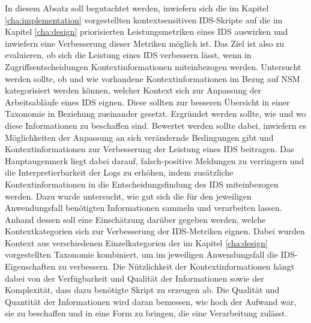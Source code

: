 In diesem Absatz soll begutachtet werden, inwiefern sich die im Kapitel \ref{cha:implementation} vorgestellten kontextsensitiven IDS-Skripte auf die im Kapitel \ref{cha:design} priorisierten Leistungsmetriken eines IDS auswirken und inwiefern eine Verbesserung dieser Metriken möglich ist. Das Ziel ist also zu evaluieren, ob sich die Leistung eines IDS verbessern lässt, wenn in Zugriffsentscheidungen Kontextinformationen miteinbezogen werden.
Untersucht werden sollte, ob und wie vorhandene Kontextinformationen im Bezug auf NSM kategorisiert werden können, welcher Kontext sich zur Anpassung der Arbeitsabläufe eines IDS eignen. Diese sollten zur besseren Übersicht in einer Taxonomie in Beziehung zueinander gesetzt.
Ergründet werden sollte, wie und wo diese Informationen zu beschaffen sind.
Bewertet werden sollte dabei, inwiefern es Möglichkeiten der Anpassung an sich verändernde Bedingungen gibt und Kontextinformationen zur Verbesserung der Leistung eines IDS beitragen.
Das Hauptaugenmerk liegt dabei darauf, falsch-positive Meldungen zu verringern und die Interpretierbarkeit der Logs zu erhöhen, indem zusätzliche Kontextinformationen in die Entscheidungsfindung des IDS miteinbezogen werden. Dazu wurde untersucht, wie gut sich die für den jeweiligen Anwendungsfall benötigten Informationen sammeln und verarbeiten lassen. Anhand dessen soll eine Einschätzung darüber gegeben werden, welche Kontextkategorien sich zur Verbesserung der IDS-Metriken eignen.
Dabei wurden Kontext aus verschiedenen Einzelkategorien der im Kapitel \ref{cha:design} vorgestellten Taxonomie kombiniert, um im jeweiligen Anwendungsfall die IDS-Eigenschaften zu verbessern.
Die Nützlichkeit der Kontextinformationen hängt dabei von der Verfügbarkeit und Qualität der Informationen sowie der Komplexität, dass dazu benötigte Skript zu erzeugen ab. 
Die Qualität und Quantität der Informationen wird daran bemessen, wie hoch der Aufwand war, sie zu beschaffen und in eine Form zu bringen, die eine Verarbeitung zulässt.




